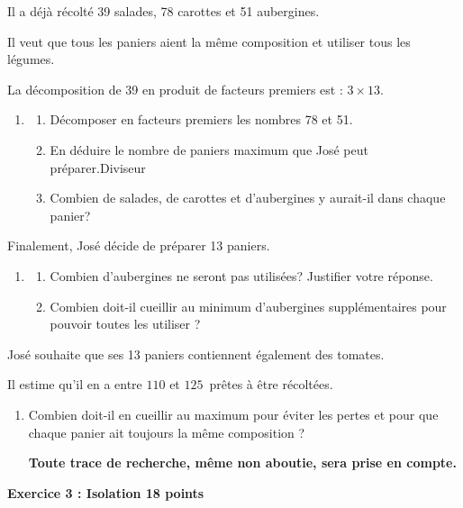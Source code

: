 \documentclass[11pt]{article}
\begin{document}
Il a déjà récolté 39 salades, 78 carottes et 51 aubergines.

Il veut que tous les paniers aient la même composition et utiliser tous les légumes.

La décomposition de 39 en produit de facteurs premiers est : $3 \times 13$.

\medskip

\begin{enumerate}
\item 
	\begin{enumerate}
		\item Décomposer en facteurs premiers les nombres 78 et 51.
		\item En déduire le nombre de paniers maximum que José peut préparer.\index{}Diviseur
		\item Combien de salades, de carottes et d'aubergines y aurait-il dans chaque panier?
	\end{enumerate}
\end{enumerate}

Finalement, José décide de préparer 13 paniers.

\begin{enumerate}[resume]
\item 
	\begin{enumerate}
		\item Combien d'aubergines ne seront pas utilisées? Justifier votre réponse.
		\item Combien doit-il cueillir au minimum d'aubergines supplémentaires pour pouvoir toutes les utiliser ?
			\end{enumerate}
\end{enumerate}

José souhaite que ses 13 paniers contiennent également des tomates.

Il estime qu'il en a entre $110$ et $125$~prêtes à être récoltées.

\begin{enumerate}[resume]
\item Combien doit-il en cueillir au maximum pour éviter les pertes et pour que chaque panier ait toujours la même composition ?

\textbf{Toute trace de recherche, même non aboutie, sera prise en compte.}
\end{enumerate}

\bigskip

\textbf{Exercice 3 :  Isolation \hfill 18 points}
\end{document}
